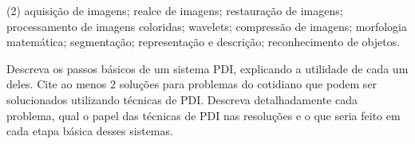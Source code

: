\documentclass[12pt,a4paper]{article}
\begin{document}
\begin{solution}
    \begin{tasks}(2)
        \task aquisição de imagens;
        \task realce de imagens;
        \task restauração de imagens;
        \task processamento de imagens coloridas;
        \task wavelets;
        \task compressão de imagens;
        \task morfologia matemática;
        \task segmentação;
        \task representação e descrição;
        \task reconhecimento de objetos.
    \end{tasks}
\end{solution}



\begin{question}{1}
Descreva os passos básicos de um sistema PDI, explicando a utilidade de cada um
deles. Cite ao menos 2 soluções para problemas do cotidiano que podem ser
solucionados utilizando técnicas de PDI. Descreva detalhadamente cada problema,
qual o papel das técnicas de PDI nas resoluções e o que seria feito em cada
etapa básica desses sistemas.
\end{question}


\pagebreak
\medskip
\printbibliography[
    heading=bibintoc,
    title={Referências Bibliográficas}
]
\end{document}
